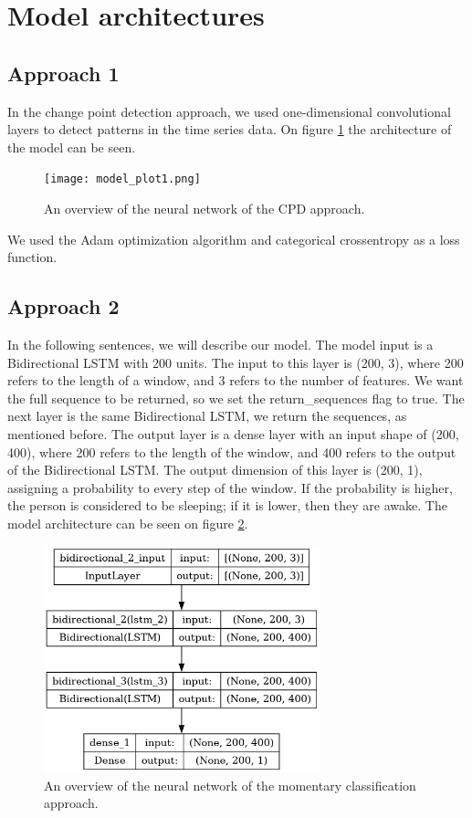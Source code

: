 \documentclass{article}
\begin{document}
\section{Model architectures}
\subsection{Approach 1}
In the change point detection approach, we used one-dimensional convolutional layers to detect patterns in the time series data. On figure \ref{fig:model-cpd} the architecture of the model can be seen.

\begin{figure}
  \label{fig:model-cpd}
  \centering
  \texttt{[image: model\_plot1.png]}
  \caption{An overview of the neural network of the CPD approach.}
\end{figure}

We used the Adam optimization algorithm and categorical crossentropy as a loss function.

\subsection{Approach 2}
In the following sentences, we will describe our model. The model input is a Bidirectional LSTM with 200 units. The input to this layer is (200, 3), where 200 refers to the length of a window, and 3 refers to the number of features. We want the full sequence to be returned, so we set the return\_sequences flag to true. The next layer is the same Bidirectional LSTM, we return the sequences, as mentioned before. The output layer is a dense layer with an input shape of (200, 400), where 200 refers to the length of the window, and 400 refers to the output of the Bidirectional LSTM. The output dimension of this layer is (200, 1), assigning a probability to every step of the window. If the probability is higher, the person is considered to be sleeping; if it is lower, then they are awake. The model architecture can be seen on figure \ref{fig:model-lstm}.

\begin{figure}
  \label{fig:model-lstm}
  \centering
  \includegraphics[width=8cm]{model_plot-2.png}
  \caption{An overview of the neural network of the momentary classification approach.}
\end{figure}
\end{document}
